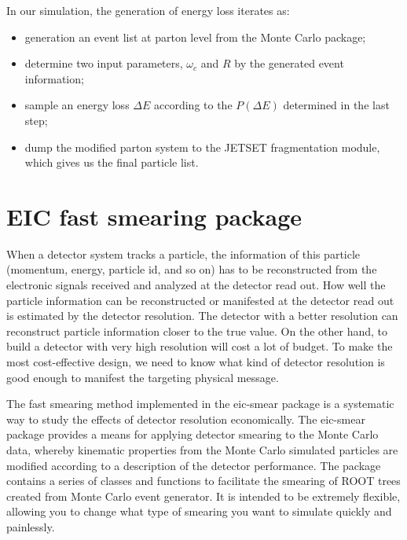 In our simulation, the generation of energy loss iterates as:
\begin{itemize}
	\item generation an event list at parton level from the Monte Carlo package;
	\item determine two input parameters, $\omega_{c}$ and $R$ by the generated event information;
	\item sample an energy loss $\Delta E$ according to the $P(\Delta E)$ determined in the last step;
	\item dump the modified parton system to the JETSET fragmentation module, which gives us the final particle list.
\end{itemize}

%

\section{EIC fast smearing package}
When a detector system tracks a particle, the information of this particle
(momentum, energy, particle id, and so on) has to be reconstructed from the electronic
signals received and analyzed at the detector read out. How well the particle
information can be reconstructed or manifested at the detector read out is
estimated by the detector resolution. The detector with a better resolution
can reconstruct particle information closer to the true value. On
the other hand, to build a detector with very high resolution will cost a lot
of budget. To make the most cost-effective design, we need to know what kind
of detector resolution is good enough to manifest the targeting physical message.

The fast smearing method implemented in the eic-smear package is a systematic
way to study the effects of detector resolution economically. The eic-smear
package provides a means for applying detector smearing to the Monte Carlo
data, whereby kinematic properties from the Monte Carlo simulated particles are modified according
to a description of the detector performance. The package contains a series of
classes and functions to facilitate the smearing of ROOT trees created from
Monte Carlo event generator. It is intended to be extremely flexible,
allowing you to change what type of smearing you want to simulate quickly and
painlessly.


